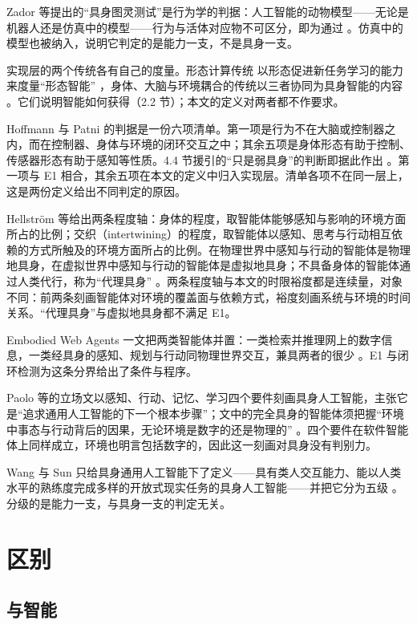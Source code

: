 \documentclass[10pt,fontset=fandol]{ctexart}
\begin{document}
Zador 等提出的“具身图灵测试”是行为学的判据：人工智能的动物模型——无论是机器人还是仿真中的模型——行为与活体对应物不可区分，即为通过 \cite{zador2023}。仿真中的模型也被纳入，说明它判定的是能力一支，不是具身一支。

实现层的两个传统各有自己的度量。形态计算传统 \cite{muller2017} 以形态促进新任务学习的能力来度量“形态智能” \cite{gupta2021}，身体、大脑与环境耦合的传统以三者协同为具身智能的内容 \cite{liu2025csur,pfeifer2007}。它们说明智能如何获得（2.2 节）；本文的定义对两者都不作要求。

Hoffmann 与 Patni 的判据是一份六项清单。第一项是行为不在大脑或控制器之内，而在控制器、身体与环境的闭环交互之中；其余五项是身体形态有助于控制、传感器形态有助于感知等性质。4.4 节援引的“只是弱具身”的判断即据此作出 \cite{hoffmann2025}。第一项与 E1 相合，其余五项在本文的定义中归入实现层。清单各项不在同一层上，这是两份定义给出不同判定的原因。

Hellström 等给出两条程度轴：身体的程度，取智能体能够感知与影响的环境方面所占的比例；交织（intertwining）的程度，取智能体以感知、思考与行动相互依赖的方式所触及的环境方面所占的比例。在物理世界中感知与行动的智能体是物理地具身，在虚拟世界中感知与行动的智能体是虚拟地具身；不具备身体的智能体通过人类代行，称为“代理具身” \cite{hellstrom2024}。两条程度轴与本文的时限裕度都是连续量，对象不同：前两条刻画智能体对环境的覆盖面与依赖方式，裕度刻画系统与环境的时间关系。“代理具身”与虚拟地具身都不满足 E1。

Embodied Web Agents 一文把两类智能体并置：一类检索并推理网上的数字信息，一类经具身的感知、规划与行动同物理世界交互，兼具两者的很少 \cite{ewa2025}。E1 与闭环检测为这条分界给出了条件与程序。

Paolo 等的立场文以感知、行动、记忆、学习四个要件刻画具身人工智能，主张它是“追求通用人工智能的下一个根本步骤”；文中的完全具身的智能体须把握“环境中事态与行动背后的因果，无论环境是数字的还是物理的” \cite{paolo2024}。四个要件在软件智能体上同样成立，环境也明言包括数字的，因此这一刻画对具身没有判别力。

Wang 与 Sun 只给具身通用人工智能下了定义——具有类人交互能力、能以人类水平的熟练度完成多样的开放式现实任务的具身人工智能——并把它分为五级 \cite{wangsung2025}。分级的是能力一支，与具身一支的判定无关。

\section{区别}\label{sec:s5}

\subsection{与智能}
\end{document}
